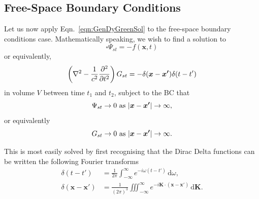 \documentclass[12pt,english]{article}
\newcommand{\dmr}[1]{\, \mathrm{d}#1} %
\renewcommand{\vec}[1]{\boldsymbol{#1}}
\begin{document}
\subsection{Free-Space Boundary Conditions}
Let us now apply Eqn.~\ref{eqn:GenDyGreenSol} to the free-space boundary conditions case. Mathematically speaking, we wish to find a solution to
\begin{equation}
    \square \Psi_{st} = -f(\vec{x}, t)
\end{equation}
or equivalently,
\begin{equation*}
    \left( \laplacian - \frac{1}{c^2} \pdv[2]{t} \right)G_{st} = -\delta(\vec{x}-\vec{x'})\delta(t - t')
\end{equation*}
in volume $V$ between time $t_1$ and $t_2$, subject to the BC that
\begin{equation*}
    \Psi_{st} \to 0 \text{ as } \abs{\vec{x} - \vec{x'}} \to \infty,
\end{equation*}
or equivalently
\begin{equation}
    G_{st} \to 0 \text{ as } \abs{\vec{x} - \vec{x'}} \to \infty.
\end{equation}

This is most easily solved by first recognising that the Dirac Delta functions can be written the following Fourier transforms
\begin{subequations}
    \begin{align}
        \delta(t - t')             & = \frac{1}{2\pi}\int_{-\infty}^{\infty}e^{-i\omega(t-t')}\dmr{\omega},                          \\
        \delta(\vec{x} - \vec{x'}) & = \frac{1}{(2\pi)^3}\iiint_{-\infty}^{\infty}e^{-i\vec{K}\cdot(\vec{x}-\vec{x'})}\dmr{\vec{K}}.
    \end{align}
\end{subequations}
\end{document}
